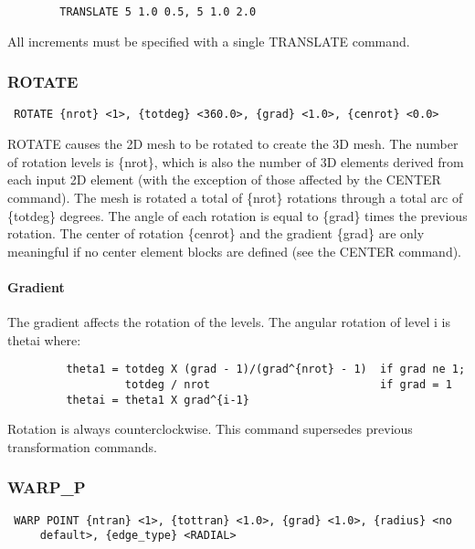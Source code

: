 \begin{verbatim}
        TRANSLATE 5 1.0 0.5, 5 1.0 2.0
\end{verbatim}

All increments must be specified with a single TRANSLATE command.
\subsubsection{ROTATE}
\begin{verbatim}
 ROTATE {nrot} <1>, {totdeg} <360.0>, {grad} <1.0>, {cenrot} <0.0>
\end{verbatim}

ROTATE causes the 2D mesh to be rotated to create the 3D mesh.  The
number of rotation levels is \{nrot\}, which is also the number of 3D
elements derived from each input 2D element (with the exception of those
affected by the CENTER command).  The mesh is rotated a total of \{nrot\}
rotations through a total arc of \{totdeg\} degrees.  The angle of each
rotation is equal to \{grad\} times the previous rotation.  The center of
rotation \{cenrot\} and the gradient \{grad\} are only meaningful if no
center element blocks are defined (see the CENTER command).
\paragraph{Gradient}
The gradient affects the rotation of the levels.  The angular rotation
of level i is thetai where:  
\begin{verbatim}
         theta1 = totdeg X (grad - 1)/(grad^{nrot} - 1)  if grad ne 1;
                  totdeg / nrot                          if grad = 1
         thetai = theta1 X grad^{i-1}
\end{verbatim}
Rotation is always counterclockwise.  This command supersedes previous
transformation commands. 
\subsubsection{WARP\_P}
\begin{verbatim}
 WARP POINT {ntran} <1>, {tottran} <1.0>, {grad} <1.0>, {radius} <no
     default>, {edge_type} <RADIAL>
\end{verbatim}

